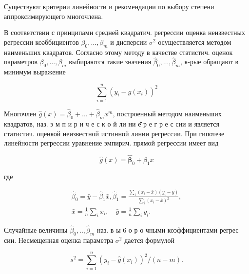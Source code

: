 \documentclass[10pt]{article}
\begin{document}
Существуют критерии линейности и рекомендации по выбору степени аппроксимирующего многочлена.



В соответствии с принципами средней квадратич. регрессии оценка неизвестных регрессии коәббициентов $\beta_{0}, \ldots, \beta_{m}$ и дисперсии $\sigma^{2}$ осуществляется методом наименьших квадратов. Согласно этому методу в качестве статистич. оценок параметров $\beta_{0}, \ldots, \beta_{m}$ выбираются такие значения $\hat{\beta}_{0}, \ldots, \hat{\beta}_{m}$, к-рые обращают в минимум выражение



\[

\sum_{i=1}^{n}\left(y_{i}-g\left(x_{i}\right)\right)^{2}

\]



Многочлен $\hat{g}(x)=\widehat{\beta}_{0}+\ldots+\widehat{\beta}_{m} x^{m}$, построенный методом наименьших квадратов, наз. э м п и р и ч е с к о й ли ни ё̈̈ р е г р е с сии и является статистич. оценкой неизвестной истинной линии регрессии. При гипотезе линейности регрессии уравнение эмпирич. прямой регрессии имеет вид



\[

\hat{g}(x)=\hat{\boldsymbol{\beta}}_{0}+\hat{\beta}_{1} x

\]



где



\[

\begin{gathered}

\widehat{\beta}_{0}=\bar{y}-\hat{\beta}_{1} \bar{x}, \hat{\beta}_{1}=\frac{\sum_{i}\left(x_{i}-\bar{x}\right)\left(y_{i}-y\right)}{\sum_{i}\left(x_{i}-\bar{x}\right)^{2}}, \\

\bar{x}=\frac{1}{n} \sum_{i} x_{i}, \quad \bar{y}=\frac{1}{n} \sum_{i} y_{i} .

\end{gathered}

\]



Случайные величины $\widehat{\beta}_{0}, . ., \widehat{\beta}_{m}$ наз. в ы 6 о р о чными коэффициентами регрес сии. Несмещенная оценка параметра $\sigma^{2}$ дается формулой



\[

s^{2}=\sum_{i=1}^{n}\left(y_{i}-\hat{g}\left(x_{i}\right)\right)^{2} /(n-m) .

\]
\end{document}
